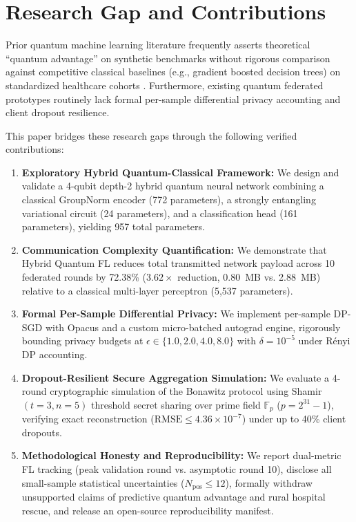 \documentclass[conference]{IEEEtran}
\begin{document}
\section{Research Gap and Contributions}
Prior quantum machine learning literature frequently asserts theoretical ``quantum advantage'' on synthetic benchmarks without rigorous comparison against competitive classical baselines (e.g., gradient boosted decision trees) on standardized healthcare cohorts \cite{huang2021quantum}. Furthermore, existing quantum federated prototypes routinely lack formal per-sample differential privacy accounting and client dropout resilience.

This paper bridges these research gaps through the following verified contributions:
\begin{enumerate}
    \item \textbf{Exploratory Hybrid Quantum-Classical Framework:} We design and validate a 4-qubit depth-2 hybrid quantum neural network combining a classical GroupNorm encoder (772 parameters), a strongly entangling variational circuit (24 parameters), and a classification head (161 parameters), yielding 957 total parameters.
    \item \textbf{Communication Complexity Quantification:} We demonstrate that Hybrid Quantum FL reduces total transmitted network payload across 10 federated rounds by 72.38\% ($3.62\times$ reduction, 0.80~MB vs. 2.88~MB) relative to a classical multi-layer perceptron (5,537 parameters).
    \item \textbf{Formal Per-Sample Differential Privacy:} We implement per-sample DP-SGD with Opacus and a custom micro-batched autograd engine, rigorously bounding privacy budgets at $\epsilon \in \{1.0, 2.0, 4.0, 8.0\}$ with $\delta = 10^{-5}$ under Rényi DP accounting.
    \item \textbf{Dropout-Resilient Secure Aggregation Simulation:} We evaluate a 4-round cryptographic simulation of the Bonawitz protocol using Shamir $(t=3, n=5)$ threshold secret sharing over prime field $\mathbb{F}_p$ ($p = 2^{31}-1$), verifying exact reconstruction ($\text{RMSE} \le 4.36 \times 10^{-7}$) under up to 40\% client dropouts.
    \item \textbf{Methodological Honesty and Reproducibility:} We report dual-metric FL tracking (peak validation round vs. asymptotic round 10), disclose all small-sample statistical uncertainties ($N_{\text{pos}} \le 12$), formally withdraw unsupported claims of predictive quantum advantage and rural hospital rescue, and release an open-source reproducibility manifest.
\end{enumerate}
\end{document}
